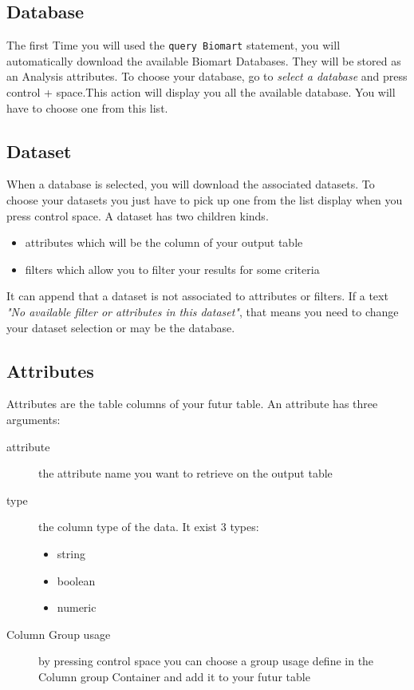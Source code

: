 \subsection{Database}
The first Time you will used the \texttt{query Biomart} statement, you will automatically download the available Biomart Databases. They will be stored as an Analysis attributes. To choose your database, go to \textit{select a database} and press control + space.This action will display you all the available database. You will have to choose one from this list. 
\subsection{Dataset}
When a database  is selected, you will download the associated datasets. To choose your datasets you just have to pick up one from the list display when you press control space.
A dataset has two children kinds.
\begin{itemize}
\item attributes which will be the column of your output table
\item filters which allow you to filter your results for some criteria
\end{itemize}
It can append that a dataset is not associated to attributes or filters. If a text \textit{"No available filter or attributes in this dataset"}, that means you need to change your dataset selection or may be the database. 

\subsection{Attributes}
Attributes are the table columns of your futur table. An attribute has three arguments:
\begin{description}
\item [attribute] the attribute name you want to retrieve on the output table
\item [type] the column type of the data. It exist 3 types:
\begin{itemize}
\item string 
\item boolean 
\item numeric
\end{itemize}

\item [Column Group usage] by pressing control space you can choose a group usage define in the Column group Container and add it to your futur table
\end{description}

